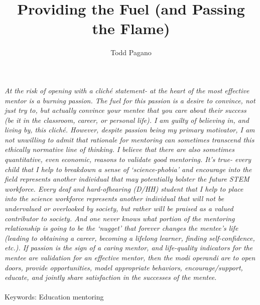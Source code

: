 \documentclass[11.5pt]{sig-alternate} %
\makeatletter
\let\oldabstract\abstract
\let\oldendabstract\endabstract
\renewenvironment{abstract} %
{\renewenvironment{quotation}%
               {\list{}{\addtolength{\leftmargin}{1em} %
                        \listparindent 1.5em%
                        \itemindent    \listparindent%
                        \rightmargin   \leftmargin%
                        \parsep        \z@ \@plus\p@}%
                \item\relax}%
               {\endlist}%
\oldabstract}
{\oldendabstract}
\makeatother
\begin{document}
\title{Providing the Fuel (and Passing the Flame)}

\author[1]{\large \color{blue}Todd Pagano}


\toappear{}
\maketitle
\begin{@twocolumnfalse} 
\begin{abstract}
\item 
\textit{At the risk of opening with a cliché statement- at the heart of the most effective mentor is a burning passion. The fuel for this passion is a desire to convince, not just try to, but actually convince your mentee that you care about their success (be it in the classroom, career, or personal life). I am guilty of believing in, and living by, this cliché. However, despite passion being my primary motivator, I am not unwilling to admit that rationale for mentoring can sometimes transcend this ethically normative line of thinking. I believe that there are also sometimes quantitative, even economic, reasons to validate good mentoring. It’s true- every child that I help to breakdown a sense of ‘science-phobia’ and encourage into the field represents another individual that may potentially bolster the future STEM workforce. Every deaf and hard-ofhearing (D/HH) student that I help to place into the science workforce represents another individual that will not be undervalued or overlooked by society, but rather will be praised as a valued contributor to society. And one never knows what portion of the mentoring relationship is going to be the ‘nugget’ that forever changes the mentee’s life (leading to obtaining a career, becoming a lifelong learner, finding self-confidence, etc.). If passion is the sign of a caring mentor, and life-quality indicators for the mentee are validation for an effective mentor, then the modi operandi are to open doors, provide opportunities, model appropriate behaviors, encourage/support, educate, and jointly share satisfaction in the successes of the mentee.}
\\ \\
Keywords: Education mentoring
\end{abstract}
\end{@twocolumnfalse}

\end{document}
